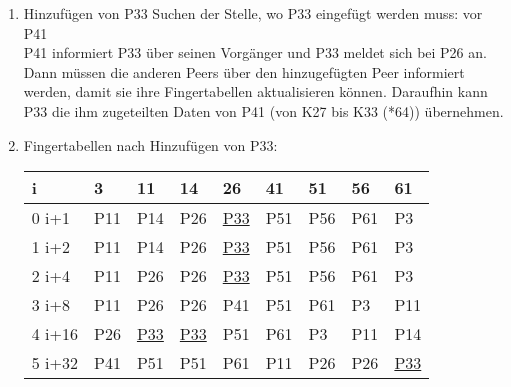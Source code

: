 \documentclass[a4paper, landscape]{article}
\begin{document}
\begin{enumerate}[label=\alph*)]
\item Hinzufügen von P33
Suchen der Stelle, wo P33 eingefügt werden muss: vor P41\\
P41 informiert P33 über seinen Vorgänger und P33 meldet sich bei P26 an. \\
 Dann müssen die anderen Peers über den hinzugefügten Peer informiert werden, damit sie ihre Fingertabellen aktualisieren können. Daraufhin kann P33 die ihm zugeteilten Daten von P41 (von K27 bis K33 (*64)) übernehmen.

\item Fingertabellen nach Hinzufügen von P33:
\begin{tabular}{| l | l | l | l | l | l | l | l | l |}
\hline 
i & 3 & 11 & 14 & 26 & 41 & 51 & 56 & 61\\
\hline
\hline
0 i+1 & P11 & P14 & P26 & \underline{P33} & P51 & P56 & P61 & P3\\
1 i+2 & P11 & P14 & P26 & \underline{P33} & P51 & P56 & P61 & P3\\
2 i+4 & P11 & P26 & P26 & \underline{P33} & P51 & P56 & P61 & P3\\
3 i+8 & P11 & P26 & P26 & P41 & P51 & P61 & P3 & P11\\
4 i+16 & P26 & \underline{P33} & \underline{P33} & P51 & P61 & P3 & P11 & P14\\
5 i+32 & P41 & P51 & P51 & P61 & P11 & P26 & P26 & \underline{P33}\\

\hline
\end{tabular}

\end{enumerate}
\end{document}
